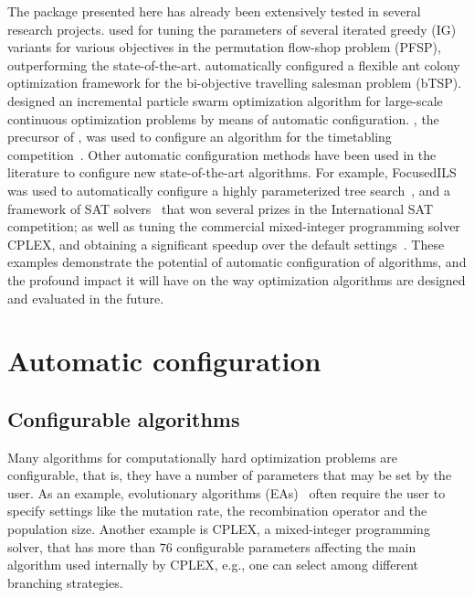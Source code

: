 \documentclass[article,a4paper,nojss,notitle]{jss}
\newcommand{\eg}{e.g.}%
\newcommand{\MANUEL}[1]{{\footnotesize\noindent\textbf{[~MANUEL: #1~]}}}
\newcommand{\irace}{\pkg{irace}\xspace}
\newcommand{\FRACE}{\text{F-Race}\xspace}
\newcommand{\IFRACE}{\text{I/F-Race}\xspace}
\begin{document}
The \irace package presented here has already been extensively tested
in several research
projects. \citet{DubLopStu2011amai,DubLopStu2011cor} used \irace for
tuning the parameters of several iterated greedy (IG) variants for
various objectives in the permutation flow-shop problem (PFSP),
outperforming the state-of-the-art.  \citet{LopStu2010:ants}
automatically configured a flexible ant colony optimization framework
for the bi-objective travelling salesman problem
(bTSP). \citet{MonAydStu2011soco} designed an incremental particle
swarm optimization algorithm for large-scale continuous optimization
problems by means of automatic configuration. \FRACE, the precursor of
\IFRACE, was used to configure an algorithm for the timetabling
competition~\citep{ChiBirSocRos2006jos}. Other automatic configuration
methods have been used in the literature to configure new
state-of-the-art algorithms. For example,
FocusedILS~\citep{HutHooLeyStu2009jair} was used to automatically
configure a highly parameterized tree
search~\citep{HutBabHooHu2007fmcad}, and a framework of SAT
solvers~\citep{KhuXuHooLey2009:satenstein} that won several prizes in
the International SAT competition; as well as tuning the commercial
mixed-integer programming solver CPLEX, and obtaining a significant
speedup over the default settings~\citep{HutHooLey2010:cpaior}.
%
These examples demonstrate the potential of automatic configuration of
algorithms, and the profound impact it will have on the way
optimization algorithms are designed and evaluated in the future.

\section{Automatic configuration}\label{sec:prelim}

\subsection{Configurable algorithms}

Many algorithms for computationally hard optimization problems are
configurable, that is, they have a number of parameters that may be
set by the user. As an example, evolutionary algorithms
(EAs)~\citep{Goldberg89} often require the user to specify settings
like the mutation rate, the recombination operator and the population
size. Another example is CPLEX, a mixed-integer programming solver,
that has more than $76$ configurable parameters affecting the main
algorithm used internally by CPLEX, \eg{}, one can select among
different branching strategies.
\end{document}
